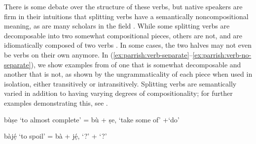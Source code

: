 \documentclass[output=paper]{LSP/langsci}
\begin{document}
There is some debate over the structure of these verbs, but native speakers are firm in their intuitions that splitting verbs have a semantically noncompositional meaning, as are many scholars in the field \citep{Bode2007,Awobuluyi1967,Awobuluyi1971,Bamgbose1966}. While some splitting verbs are decomposable into two somewhat compositional pieces, others are not, and are idiomatically composed of two verbs \citep{Awobuluyi1971}. In some cases, the two halves may not even be verbs on their own anymore. In (\ref{ex:parrish:verb-separate}–\ref{ex:parrish:verb-no-separate}), we show examples from \citet{Awobuluyi1971} of one  that is somewhat decomposable and another that is not, as shown by the ungrammaticality of each piece when used in isolation, either transitively or intransitively. Splitting verbs are semantically varied in addition to having varying degrees of compositionality; for further examples demonstrating this, see \citet{Awobuluyi1971}.

\ea b\`{u}\d{s}e `to almost complete' = b\`{u}  + \d{s}e, `take some of' +`do'
\label{ex:parrish:verb-separate}
\z 

\ea  b\`{a}j\d{\'{e}} `to spoil' = b\`{a} + j\d{\'{e}}, `?' + `?'
	

		
		\z

	
\label{ex:parrish:verb-no-separate}
\z 

\end{document}
